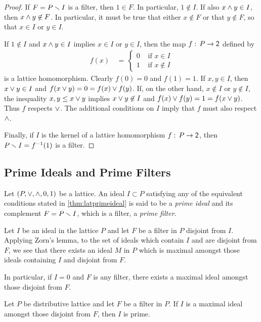 \begin{proof}
	If $F=P\smallsetminus I$ is a filter, then $1\in F$. In particular,
	$1\not\in I$. If also $x\wedge y\in I$, then
	$x\wedge y\not\in F$. In particular, it must be true that either
	$x\not\in F$ or that $y\not\in F$, so that $x\in I$ or $y\in I$.

	If $1\not\in I$ and $x\wedge y\in I$ implies $x\in I$ or $y\in I$,
	then the map $f:\,P\rightarrow\mathsf{2}$ defined by
	\begin{align*}
		f(x) & \,=\,
			\begin{cases}
				0 & \text{ if } x\in I \\
				1 & \text{ if } x\not\in I
			\end{cases}
	\end{align*}
	is a lattice homomorphism. Clearly $f(0)=0$ and $f(1)=1$.
	If $x,y\in I$, then $x\vee y\in I$ and
	$f(x\vee y)=0=f(x)\vee f(y)$. If, on the other hand,
	$x\not\in I$ or $y\not\in I$, the inequality $x,y\leq x\vee y$
	implies $x\vee y\not\in I$ and
	$f(x)\vee f(y)=1=f(x\vee y)$. Thus $f$ respects $\vee$.
	The additional conditions on $I$ imply that $f$ must also respect
	$\wedge$.

	Finally, if $I$ is the kernel of a lattice homomorphism
	$f:\,P\rightarrow\mathsf{2}$, then $P\smallsetminus I=f^{-1}(1)$ is a filter.
\end{proof}

\subsection{Prime Ideals and Prime Filters}
Let $(P,\vee,\wedge,0,1)$ be a lattice. An ideal $I\subset P$
satisfying any of the equivalent conditions stated in \ref{thm:latprimeideal}
is said to be a \emph{prime ideal} and its complement $F=P\smallsetminus I$,
which is a filter, a \emph{prime filter}.

Let $I$ be an ideal in the lattice $P$ and let $F$ be a filter in $P$
disjoint from $I$. Applying Zorn's lemma, to the set of ideals which contain
$I$ and are disjoint from $F$, we see that there exists an ideal $M$ in $P$
which is maximal amongst those ideals containing $I$ and disjoint from $F$.

In particular, if $I=0$ and $F$ is any filter, there exists a maximal ideal
amongst those disjoint from $F$.

\begin{thmMaxDisjointIdealIsPrime}\label{thm:maxdisjointidealisprime}
	Let $P$ be distributive lattice and let $F$ be a filter in $P$.
	If $I$ is a maximal ideal amongst those disjoint from $F$, then
	$I$ is prime.
\end{thmMaxDisjointIdealIsPrime}

